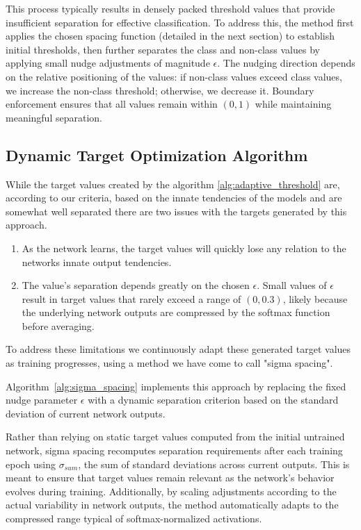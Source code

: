 \documentclass[12pt,fleqn,a4paper]{article}
\begin{document}
This process typically results in densely packed threshold values that provide insufficient separation for effective classification. To address this, the method first applies the chosen spacing function (detailed in the next section) to establish initial thresholds, then further separates the class and non-class values by applying small nudge adjustments of magnitude $\epsilon$. The nudging direction depends on the relative positioning of the values: if non-class values exceed class values, we increase the non-class threshold; otherwise, we decrease it. Boundary enforcement ensures that all values remain within $(0,1)$ while maintaining meaningful separation.

\subsection{Dynamic Target Optimization Algorithm}
While the target values created by the algorithm \ref{alg:adaptive_threshold} are, according to our criteria, based on the innate tendencies of the models and are somewhat well separated there are two issues with the targets generated by this approach.
\begin{enumerate}
    \item As the network learns, the target values will quickly lose any relation to the networks innate output tendencies.
    \item The value's separation depends greatly on the chosen $\epsilon$. Small values of $\epsilon$ result in target values that rarely exceed a range of $(0, 0.3)$, likely because the underlying network outputs are compressed by the softmax function before averaging.
\end{enumerate}
To address these limitations we continuously adapt these generated target values as training progresses, using a method we have come to call "sigma spacing". 

Algorithm~\ref{alg:sigma_spacing} implements this approach by replacing the fixed nudge parameter $\epsilon$ with a dynamic separation criterion based on the standard deviation of current network outputs.

Rather than relying on static target values computed from the initial untrained network, sigma spacing recomputes separation requirements after each training epoch using $\sigma_{sum}$, the sum of standard deviations across current outputs. This is meant to ensure that target values remain relevant as the network's behavior evolves during training. Additionally, by scaling adjustments according to the actual variability in network outputs, the method automatically adapts to the compressed range typical of softmax-normalized activations.
\end{document}
